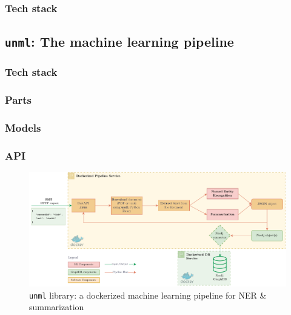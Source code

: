 \documentclass[11pt]{article}
\begin{document}
\subsubsection*{Tech stack}



\subsection{\texttt{unml}: The machine learning pipeline}

\subsubsection*{Tech stack}

\subsubsection{Parts}


\subsubsection{Models}

\subsubsection{API}


\begin{figure}[!htb]
    \centering

    \includegraphics[width=\textwidth]{res/ml-pipeline.pdf}
    \caption{\texttt{unml} library: a dockerized machine learning pipeline for NER \& summarization}

    \label{fig:ml-pipeline}
\end{figure}
\end{document}
